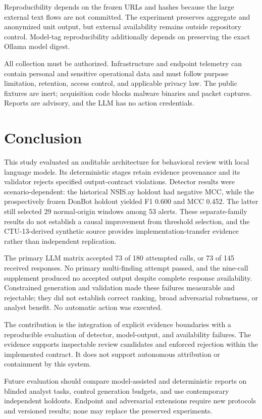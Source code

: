 \documentclass[11pt,a4paper,onecolumn]{IEEEtran}
\begin{document}
Reproducibility depends on the frozen URLs and hashes because the large external text flows are not committed. The experiment preserves aggregate and anonymized unit output, but external availability remains outside repository control. Model-tag reproducibility additionally depends on preserving the exact Ollama model digest.

All collection must be authorized. Infrastructure and endpoint telemetry can contain personal and sensitive operational data and must follow purpose limitation, retention, access control, and applicable privacy law. The public fixtures are inert; acquisition code blocks malware binaries and packet captures. Reports are advisory, and the LLM has no action credentials.

\section{Conclusion}

This study evaluated an auditable architecture for behavioral review with local language models. Its deterministic stages retain evidence provenance and its validator rejects specified output-contract violations. Detector results were scenario-dependent: the historical NSIS.ay holdout had negative MCC, while the prospectively frozen DonBot holdout yielded F1 0.600 and MCC 0.452. The latter still selected 29 normal-origin windows among 53 alerts. These separate-family results do not establish a causal improvement from threshold selection, and the CTU-13-derived synthetic source provides implementation-transfer evidence rather than independent replication.

The primary LLM matrix accepted 73 of 180 attempted calls, or 73 of 145 received responses. No primary multi-finding attempt passed, and the nine-call supplement produced no accepted output despite complete response availability. Constrained generation and validation made these failures measurable and rejectable; they did not establish correct ranking, broad adversarial robustness, or analyst benefit. No automatic action was executed.

The contribution is the integration of explicit evidence boundaries with a reproducible evaluation of detector, model-output, and availability failures. The evidence supports inspectable review candidates and enforced rejection within the implemented contract. It does not support autonomous attribution or containment by this system.

Future evaluation should compare model-assisted and deterministic reports on blinded analyst tasks, control generation budgets, and use contemporary independent holdouts. Endpoint and adversarial extensions require new protocols and versioned results; none may replace the preserved experiments.



\end{document}
